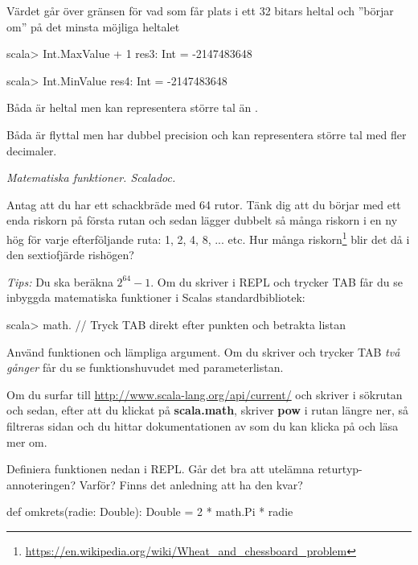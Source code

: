 \SubtaskSolved Värdet går över gränsen för vad som får plats i ett 32 bitars heltal och ''börjar om'' på det minsta möjliga heltalet 
\begin{REPL}
scala> Int.MaxValue + 1
res3: Int = -2147483648

scala> Int.MinValue
res4: Int = -2147483648
\end{REPL}

\SubtaskSolved Båda är heltal men  kan representera större tal än .

\SubtaskSolved Båda är flyttal men  har dubbel precision och kan representera större tal med fler decimaler.



\QUESTEND





\def\what{\emph{Matematiska funktioner. Scaladoc.}}

\QUESTBEGIN

\Task \what

\Subtask Antag att du har ett schackbräde med 64 rutor. Tänk dig att du börjar med ett enda riskorn på första rutan och sedan lägger dubbelt så många riskorn i en ny hög för varje efterföljande ruta: 1, 2, 4, 8, ...  etc. Hur många riskorn\footnote{\url{https://en.wikipedia.org/wiki/Wheat_and_chessboard_problem}} blir det då i den sextiofjärde rishögen?

\emph{Tips:} Du ska beräkna $2^{64} - 1$. Om du skriver  i REPL och trycker TAB får du se inbyggda matematiska funktioner i Scalas standardbibliotek:
\begin{REPL}
scala> math.    // Tryck TAB direkt efter punkten och betrakta listan
\end{REPL}
Använd funktionen  och lämpliga argument. Om du skriver  och trycker TAB \emph{två gånger} får du se funktionshuvudet med parameterlistan. 

Om du surfar till \url{http://www.scala-lang.org/api/current/} och skriver  i sökrutan och sedan, efter att du klickat på \textbf{\textsf{\small scala.math}}, skriver \textbf{\textsf{\small pow}} i rutan längre ner, så filtreras sidan och du hittar dokumentationen av  som du kan klicka på och läsa mer om.   

\Subtask Definiera funktionen  nedan i REPL. Går det bra att utelämna returtyp-annoteringen? Varför? Finns det anledning att ha den kvar?
\begin{Code}
def omkrets(radie: Double): Double = 2 * math.Pi * radie
\end{Code}

